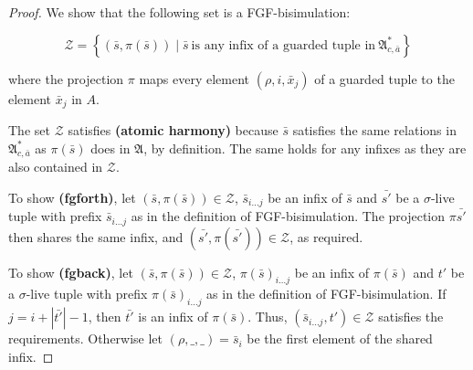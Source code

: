 \documentclass[draft]{scrartcl}
\theoremstyle{definition}
\newtheorem{definition}[theorem]{Definition}
\newtheorem{lemma}[theorem]{Lemma}
\begin{document}
\begin{proof}
  We show that the following set is a FGF-bisimulation:

  \[
    \mathcal{Z} = \left\{
      (\bar{s}, \pi(\bar{s}))
      \mid \bar{s}\
      \textrm{is any infix of a guarded tuple in}\ \mathfrak{A}^{*}_{c, \bar{a}}
    \right\}
  \]

  where the projection $\pi$ maps every element $(\rho, i, \bar{x}_{j})$ of a guarded tuple to the element $\bar{x}_{j}$ in $A$.

  The set $\mathcal{Z}$ satisfies \textbf{(atomic harmony)} because $\bar{s}$ satisfies the same relations in $\mathfrak{A}^{*}_{c,\bar{a}}$ as $\pi(\bar{s})$ does in $\mathfrak{A}$, by definition.
  The same holds for any infixes as they are also contained in $\mathcal{Z}$.

  To show \textbf{(fgforth)}, let $(\bar{s}, \pi(\bar{s})) \in \mathcal{Z}$, $\bar{s}_{i\ldots{}j}$ be an infix of $\bar{s}$ and $\bar{s'}$ be a $\sigma$-live tuple with prefix $\bar{s}_{i\ldots{}j}$ as in the definition of FGF-bisimulation.
  The projection $\pi{\bar{s'}}$ then shares the same infix, and $(\bar{s'}, \pi(\bar{s'})) \in \mathcal{Z}$, as required.

  To show \textbf{(fgback)}, let $(\bar{s}, \pi(\bar{s})) \in \mathcal{Z}$, ${\pi(\bar{s})}_{i\ldots{}j}$ be an infix of $\pi(\bar{s})$ and $t'$ be a $\sigma$-live tuple with prefix ${\pi(\bar{s})}_{i\ldots{}j}$ as in the definition of FGF-bisimulation.
  If $j = i + |\bar{t'}| - 1$, then $\bar{t'}$ is an infix of $\pi(\bar{s})$.
  Thus, $(\bar{s}_{i\ldots{}j}, t') \in \mathcal{Z}$ satisfies the requirements.
  Otherwise let $(\rho, \_, \_) = \bar{s}_{i}$ be the first element of the shared infix.


\end{proof}



\end{document}
